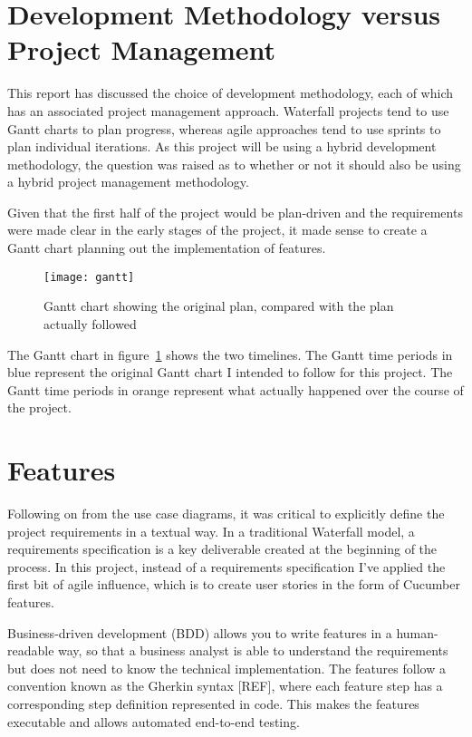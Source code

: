 \section{Development Methodology versus Project Management}

This report has discussed the choice of development methodology, each of which has an associated project management approach. Waterfall projects tend to use Gantt charts to plan progress, whereas agile approaches tend to use sprints to plan individual iterations. As this project will be using a hybrid development methodology, the question was raised as to whether or not it should also be using a hybrid project management methodology.

Given that the first half of the project would be plan-driven and the requirements were made clear in the early stages of the project, it made sense to create a Gantt chart planning out the implementation of features.

\begin{figure}[h!]
  \centering
    \ifimages
    \texttt{[image: gantt]}
    \fi
  \caption{Gantt chart showing the original plan, compared with the plan actually followed}
  \label{uml:gantt}
\end{figure}

The Gantt chart in figure~\ref{uml:gantt} shows the two timelines. The Gantt time periods in blue represent the original Gantt chart I intended to follow for this project. The Gantt time periods in orange represent what actually happened over the course of the project.

\section{Features}

Following on from the use case diagrams, it was critical to explicitly define the project requirements in a textual way. In a traditional Waterfall model, a requirements specification is a key deliverable created at the beginning of the process. In this project, instead of a requirements specification I've applied the first bit of agile influence, which is to create user stories in the form of Cucumber features.

Business-driven development (BDD) allows you to write features in a human-readable way, so that a business analyst is able to understand the requirements but does not need to know the technical implementation. The features follow a convention known as the Gherkin syntax [REF], where each feature step has a corresponding step definition represented in code. This makes the features executable and allows automated end-to-end testing.

